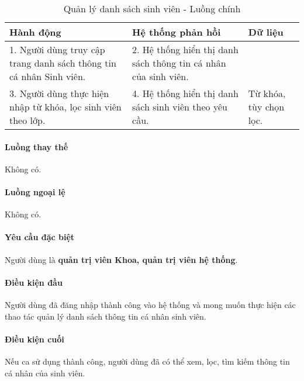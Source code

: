 \documentclass[./../main.tex]{subfiles}
\begin{document}
\begin{table}[H]
	\caption{Quản lý danh sách sinh viên - Luồng chính}
	\label{tab:orgAdmin_manage_students}
	\begin{tabularx}{\textwidth}{|X|X|X|}
		\hline
		\textbf{Hành động}                                                  & \textbf{Hệ thống phản hồi}                                      & \textbf{Dữ liệu}       \\ \hline
		1. Người dùng truy cập trang danh sách thông tin cá nhân Sinh viên. & 2. Hệ thống hiển thị danh sách thông tin cá nhân của sinh viên. &                        \\ \hline
		3. Người dùng thực hiện nhập từ khóa, lọc sinh viên theo lớp.       & 4. Hệ thống hiển thị danh sách sinh viên theo yêu cầu.          & Từ khóa, tùy chọn lọc. \\ \hline
	\end{tabularx}
\end{table}

\paragraph*{Luồng thay thế} Không có.

\paragraph*{Luồng ngoại lệ} Không có.

\paragraph*{Yêu cầu đặc biệt}

Người dùng là \textbf{quản trị viên Khoa, quản trị viên hệ thống}.

\paragraph*{Điều kiện đầu}

Người dùng đã đăng nhập thành công vào hệ thống và mong muốn thực hiện các thao tác quản lý danh sách thông tin cá nhân sinh viên.

\paragraph*{Điều kiện cuối}

Nếu ca sử dụng thành công, người dùng đã có thể xem, lọc, tìm kiếm thông tin cá nhân của sinh viên.
\end{document}
